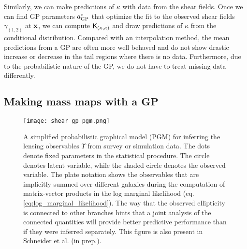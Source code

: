 Similarly, we can make predictions of $\kappa$ with data from the shear fields. 
Once we can find GP parameters $a_{\rm GP}^*$ that optimize the fit to
the observed shear fields $\gamma_{(1, 2)}$ at $\mathbf{x}$, we can compute $\mathsf{K}_{(\kappa,
\kappa)}$ and draw predictions of $\kappa$ from the conditional distribution. 
Compared with an interpolation method, the mean predictions from a GP are
often more well behaved and do not show drastic increase or decrease 
in the tail regions where there is no data. Furthermore, due to the
probabilistic nature of the GP, we do not have to treat missing 
data differently. 

\subsection{Making mass maps with a GP}
\begin{figure}
	\centering
	\texttt{[image: shear\_gp\_pgm.png]}
	\caption{A simplified probabilistic graphical model (PGM) for inferring
		the lensing observables $\Upsilon$ from survey or simulation data. The dots
		denote fixed parameters in the statistical procedure. The circle denotes
		latent variable, while the shaded circle denotes 
		the observed variable. The plate notation shows the observables that are
		implicitly summed over different galaxies during the computation of matrix-vector
		products in the log marginal likelihood (eq. \ref{eq:log_marginal_likelihood}). The way that the observed
		ellipticity is connected to other branches hints that a joint analysis of
		the connected quantities will provide better predictive performance than if
		they were inferred separately. This figure is also present in Schneider et
		al. (in prep.).
		\label{fig:simplified_pgm}}
\end{figure}


